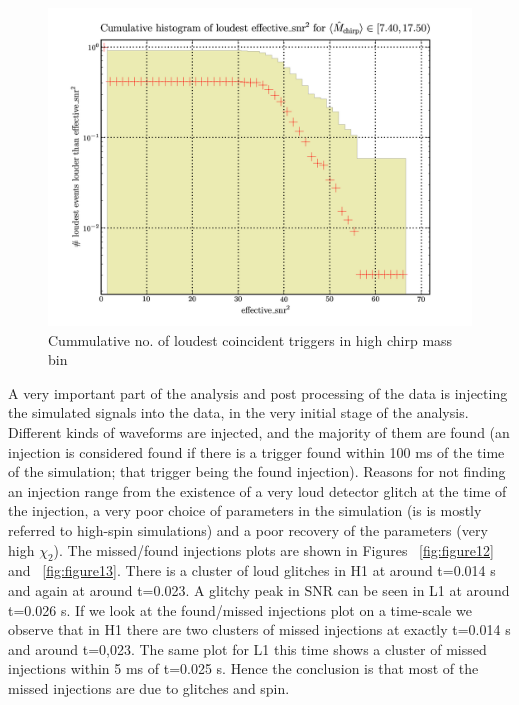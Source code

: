 \documentclass[epsf]{article}
\begin{document}
\begin{figure}[ht]
\centering
\includegraphics[scale=0.15]{Triggers_Mc3.png}
\caption{Cummulative no. of loudest coincident triggers in high chirp mass bin}
\label{fig:11}
\end{figure}

A very important part of the analysis and post processing of the data is injecting the simulated signals into the data, in the very initial stage of the analysis. Different kinds of waveforms are injected, and the majority of them are found (an injection is considered found if there is a trigger found within 100 ms of the time of the simulation; that trigger being the found injection). Reasons for not finding an injection range from the existence of a very loud detector glitch at the time of the injection, a very poor choice of parameters in the simulation (is is mostly referred to high-spin simulations) and a poor recovery of the parameters (very high $\chi_2$). The missed/found injections plots are shown in Figures ~\ref{fig:figure12} and ~\ref{fig:figure13}. There is a cluster of loud glitches in H1 at around t=0.014 s and again at around t=0.023. A glitchy peak in SNR can be seen in L1 at around t=0.026 s. If we look at the found/missed injections plot on a time-scale we observe that in H1 there are two clusters of missed injections at exactly t=0.014 s and around t=0,023. The same plot for L1 this time shows a cluster of missed injections within 5 ms of t=0.025 s. Hence the conclusion is that most of the missed injections are due to glitches and spin.
\end{document}
